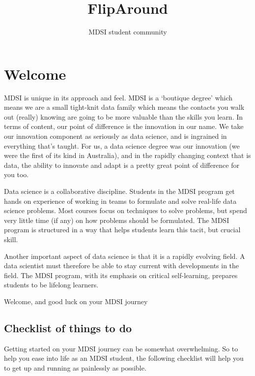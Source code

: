 \documentclass[]{book}
\title{FlipAround}
\author{MDSI student community}
\date{}
\theoremstyle{definition}
\theoremstyle{definition}
\theoremstyle{remark}
\begin{document}
\maketitle

{
\setcounter{tocdepth}{1}
\tableofcontents
}
\chapter{Welcome}\label{welcome}

MDSI is unique in its approach and feel. MDSI is a `boutique degree'
which means we are a small tight-knit data family which means the
contacts you walk out (really) knowing are going to be more valuable
than the skills you learn. In terms of content, our point of difference
is the innovation in our name. We take our innovation component as
seriously as data science, and is ingrained in everything that's taught.
For us, a data science degree was our innovation (we were the first of
its kind in Australia), and in the rapidly changing context that is
data, the ability to innovate and adapt is a pretty great point of
difference for you too.

Data science is a collaborative discipline. Students in the MDSI program
get hands on experience of working in teams to formulate and solve
real-life data science problems. Most courses focus on techniques to
solve problems, but spend very little time (if any) on how problems
should be formulated. The MDSI program is structured in a way that helps
students learn this tacit, but crucial skill.

Another important aspect of data science is that it is a rapidly
evolving field. A data scientist must therefore be able to stay current
with developments in the field. The MDSI program, with its emphasis on
critical self-learning, prepares students to be lifelong learners.

Welcome, and good luck on your MDSI journey

\section{Checklist of things to do}\label{checklist-of-things-to-do}

Getting started on your MDSI journey can be somewhat overwhelming. So to
help you ease into life as an MDSI student, the following checklist will
help you to get up and running as painlessly as possible.
\end{document}
